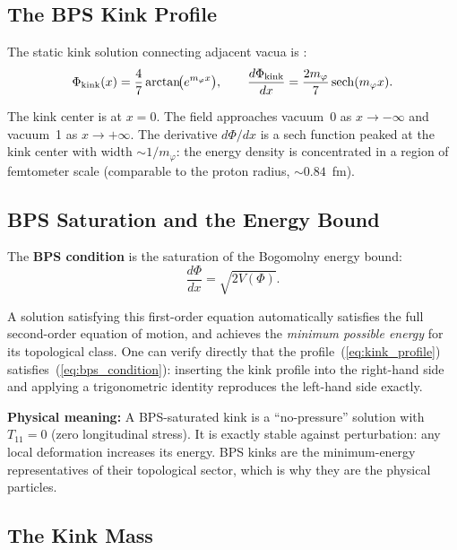 \documentclass[11pt,openany]{book}
\theoremstyle{remark}
\begin{document}
\subsection*{The BPS Kink Profile}

The static kink solution connecting adjacent vacua is \cite{SpivackPhiMDLField}:
\begin{equation}
\Phi_{\rm kink}(x) = \frac{4}{7}\arctan\!\bigl(e^{m_\varphi x}\bigr),
\qquad
\frac{d\Phi_{\rm kink}}{dx} = \frac{2m_\varphi}{7}\,\mathrm{sech}(m_\varphi x).
\label{eq:kink_profile}
\end{equation}

The kink center is at $x=0$.
The field approaches vacuum~0 as $x\to-\infty$ and vacuum~1 as $x\to+\infty$.
The derivative $d\Phi/dx$ is a sech function peaked at the kink center with width $\sim 1/m_\varphi$:
the energy density is concentrated in a region of femtometer scale
(comparable to the proton radius, $\sim 0.84$~fm).

\subsection*{BPS Saturation and the Energy Bound}

The \textbf{BPS condition} is the saturation of the Bogomolny energy bound:
\begin{equation}
\frac{d\Phi}{dx} = \sqrt{2V(\Phi)}.
\label{eq:bps_condition}
\end{equation}

A solution satisfying this first-order equation automatically satisfies the full
second-order equation of motion, and achieves the \emph{minimum possible energy}
for its topological class.
One can verify directly that the profile~(\ref{eq:kink_profile}) satisfies~(\ref{eq:bps_condition}):
inserting the kink profile into the right-hand side and applying a trigonometric identity
reproduces the left-hand side exactly.

\textbf{Physical meaning:} A BPS-saturated kink is a ``no-pressure'' solution with
$T_{11} = 0$ (zero longitudinal stress).
It is exactly stable against perturbation: any local deformation increases its energy.
BPS kinks are the minimum-energy representatives of their topological sector, which is why
they are the physical particles.

\subsection*{The Kink Mass}
\end{document}
